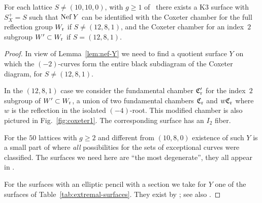\documentclass{amsart}
\begin{document}
\begin{proposition}\label{prop:small-nef-cone}
  For each lattice $S\ne(10,10,0)$,  with $g\ge1$ of \fign\ there exists
  a K3 surface with $S_X^+=S$ such that $\operatorname{Nef} Y$ can be identified
  with the Coxeter chamber for the full reflection group $W_{\rm r}$ if
  $S\ne(12,8,1)$, and the Coxeter chamber for an index~$2$ subgroup
  $W'\subset W_{\rm r}$ if $S=(12,8,1)$.
\end{proposition}
\begin{proof}
  In view of Lemma~\ref{lem:nef-Y} we need to find a quotient surface
  $Y$ on which the $(-2)$-curves form the entire black subdiagram of
  the Coxeter diagram, for $S\ne (12,8,1)$. 

  In the $(12,8,1)$ case we consider the fundamental chamber
  ${\mathfrak C}'_{\rm r}$ for the index~$2$ subgroup of $W'\subset W_{\rm r}$, a
  union of two fundamental chambers ${\mathfrak C}_{\rm r}$ and $w{\mathfrak C}_{\rm r}$ where $w$
  is the reflection in the isolated $(-4)$-root. This modified chamber
  is also pictured in Fig.~\ref{fig:coxeter1}. The corresponding
  surface has an $I_2$ fiber. 

  For the $50$ lattices with $g\ge2$ and
  different from $(10,8,0)$ existence of such $Y$ is a small part of
  \cite{alexeev2006del-pezzo} where \emph{all} possibilities for the
  sets of exceptional curves were classified. The surfaces we need
  here are ``the most degenerate'', they all appear in
  \cite[Table~3]{alexeev2006del-pezzo}.

  For the surfaces  with an elliptic pencil with a
  section we take for $Y$ one of the surfaces of
  Table~\ref{tab:extremal-surfaces}.  They exist by
  \cite{persson1990configurations-of-kodaira}; see also
  \cite{miranda1986on-extremal-rational, oguiso1991mordell-weil}.


\end{proof}
\end{document}
